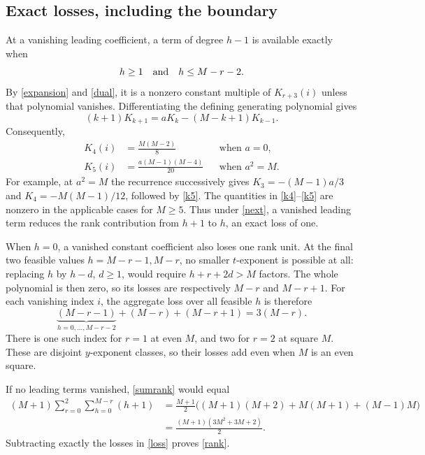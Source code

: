 \documentclass[11pt]{article}
\begin{document}
\subsection*{Exact losses, including the boundary}
At a vanishing leading coefficient, a term of degree $h-1$ is
available exactly when
\begin{equation}\label{next}
h\ge1\quad\hbox{and}\quad h\le M-r-2.
\end{equation}
By \eqref{expansion} and \eqref{dual}, it is a nonzero constant
multiple of $K_{r+3}(i)$ unless that polynomial vanishes.
Differentiating the defining generating polynomial gives
\[
(k+1)K_{k+1}=aK_k-(M-k+1)K_{k-1}.
\]
Consequently,
\begin{align}
K_4(i)&=\frac{M(M-2)}8&&\text{when }a=0,\label{k4}\\
K_5(i)&=\frac{a(M-1)(M-4)}{20}&&\text{when }a^2=M.\label{k5}
\end{align}
For example, at $a^2=M$ the recurrence successively gives
$K_3=-(M-1)a/3$ and $K_4=-M(M-1)/12$, followed by \eqref{k5}.
The quantities in \eqref{k4}--\eqref{k5} are nonzero in the
applicable cases for $M\ge5$. Thus under \eqref{next}, a vanished
leading term reduces the rank contribution from $h+1$ to $h$,
an exact loss of one.

When $h=0$, a vanished constant coefficient also loses one rank
unit. At the final two feasible values $h=M-r-1,M-r$, no smaller
$t$-exponent is possible at all: replacing $h$ by $h-d$, $d\ge1$,
would require $h+r+2d>M$ factors. The whole polynomial is then
zero, so its losses are respectively $M-r$ and $M-r+1$.
For each vanishing index $i$, the aggregate loss over all feasible
$h$ is therefore
\begin{equation}\label{loss}
\underbrace{(M-r-1)}_{h=0,\ldots,M-r-2}
+(M-r)+(M-r+1)=3(M-r).
\end{equation}
There is one such index for $r=1$ at even $M$, and two for $r=2$
at square $M$. These are disjoint $y$-exponent classes, so their
losses add even when $M$ is an even square.

If no leading terms vanished, \eqref{sumrank} would equal
\begin{align*}
(M+1)\sum_{r=0}^2\sum_{h=0}^{M-r}(h+1)
&=\frac{M+1}{2}\bigl((M+1)(M+2)+M(M+1)+(M-1)M\bigr)\\
&=\frac{(M+1)(3M^2+3M+2)}2.
\end{align*}
Subtracting exactly the losses in \eqref{loss} proves \eqref{rank}.
\end{document}
